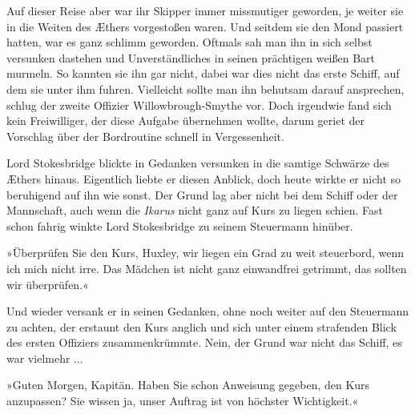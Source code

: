 Auf dieser Reise aber war ihr Skipper immer missmutiger geworden,
je weiter sie in die Weiten des Æthers vorgestoßen waren. Und
seitdem sie den Mond passiert hatten, war es ganz schlimm geworden.
Oftmals sah man ihn in sich selbst versunken dastehen und
Unverständliches in seinen prächtigen weißen Bart murmeln. So
kannten sie ihn gar nicht, dabei war dies nicht das erste Schiff,
auf dem sie unter ihm fuhren. Vielleicht sollte man ihn behutsam
darauf ansprechen, schlug der zweite Offizier Willowbrough-Smythe
vor. Doch irgendwie fand sich kein Freiwilliger, der diese Aufgabe
übernehmen wollte, darum geriet der Vorschlag über der Bordroutine
schnell in Vergessenheit.

\bigpar

Lord Stokesbridge blickte in Gedanken versunken in die samtige
Schwärze des Æthers hinaus. Eigentlich liebte er diesen Anblick,
doch heute wirkte er nicht so beruhigend auf ihn wie sonst. Der
Grund lag aber nicht bei dem Schiff oder der Mannschaft, auch wenn
die \emph{Ikarus} nicht ganz auf Kurs zu liegen schien. Fast schon
fahrig winkte Lord Stokesbridge zu seinem Steuermann hinüber.

»Überprüfen Sie den Kurs, Huxley, wir liegen ein Grad zu weit
steuerbord, wenn ich mich nicht irre. Das Mädchen ist nicht ganz
einwandfrei getrimmt, das sollten wir überprüfen.«

Und wieder versank er in seinen Gedanken, ohne noch weiter auf den
Steuermann zu achten, der erstaunt den Kurs anglich und sich unter
einem strafenden Blick des ersten Offiziers zusammenkrümmte. Nein,
der Grund war nicht das Schiff, es war vielmehr ...

»Guten Morgen, Kapitän. Haben Sie schon Anweisung gegeben, den Kurs
anzupassen? Sie wissen ja, unser Auftrag ist von höchster
Wichtigkeit.«

